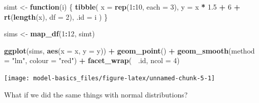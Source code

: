 \documentclass[]{book}
\newenvironment{Shaded}{\begin{snugshade}}{\end{snugshade}}
\newcommand{\ControlFlowTok}[1]{\textcolor[rgb]{0.13,0.29,0.53}{\textbf{#1}}}
\newcommand{\DataTypeTok}[1]{\textcolor[rgb]{0.13,0.29,0.53}{#1}}
\newcommand{\DecValTok}[1]{\textcolor[rgb]{0.00,0.00,0.81}{#1}}
\newcommand{\FloatTok}[1]{\textcolor[rgb]{0.00,0.00,0.81}{#1}}
\newcommand{\KeywordTok}[1]{\textcolor[rgb]{0.13,0.29,0.53}{\textbf{#1}}}
\newcommand{\NormalTok}[1]{#1}
\newcommand{\OperatorTok}[1]{\textcolor[rgb]{0.81,0.36,0.00}{\textbf{#1}}}
\newcommand{\StringTok}[1]{\textcolor[rgb]{0.31,0.60,0.02}{#1}}
\theoremstyle{plain}
\theoremstyle{remark}
\begin{document}
\begin{Shaded}
\begin{Highlighting}[]
\NormalTok{simt <-}\StringTok{ }\ControlFlowTok{function}\NormalTok{(i) \{}
  \KeywordTok{tibble}\NormalTok{(}
    \DataTypeTok{x =} \KeywordTok{rep}\NormalTok{(}\DecValTok{1}\OperatorTok{:}\DecValTok{10}\NormalTok{, }\DataTypeTok{each =} \DecValTok{3}\NormalTok{),}
    \DataTypeTok{y =}\NormalTok{ x }\OperatorTok{*}\StringTok{ }\FloatTok{1.5} \OperatorTok{+}\StringTok{ }\DecValTok{6} \OperatorTok{+}\StringTok{ }\KeywordTok{rt}\NormalTok{(}\KeywordTok{length}\NormalTok{(x), }\DataTypeTok{df =} \DecValTok{2}\NormalTok{),}
    \DataTypeTok{.id =}\NormalTok{ i}
\NormalTok{  )}
\NormalTok{\}}

\NormalTok{sims <-}\StringTok{ }\KeywordTok{map_df}\NormalTok{(}\DecValTok{1}\OperatorTok{:}\DecValTok{12}\NormalTok{, simt)}

\KeywordTok{ggplot}\NormalTok{(sims, }\KeywordTok{aes}\NormalTok{(}\DataTypeTok{x =}\NormalTok{ x, }\DataTypeTok{y =}\NormalTok{ y)) }\OperatorTok{+}
\StringTok{  }\KeywordTok{geom_point}\NormalTok{() }\OperatorTok{+}
\StringTok{  }\KeywordTok{geom_smooth}\NormalTok{(}\DataTypeTok{method =} \StringTok{"lm"}\NormalTok{, }\DataTypeTok{colour =} \StringTok{"red"}\NormalTok{) }\OperatorTok{+}
\StringTok{  }\KeywordTok{facet_wrap}\NormalTok{(}\OperatorTok{~}\StringTok{ }\NormalTok{.id, }\DataTypeTok{ncol =} \DecValTok{4}\NormalTok{)}
\end{Highlighting}
\end{Shaded}

\begin{center}\texttt{[image: model-basics\_files/figure-latex/unnamed-chunk-5-1]} \end{center}

What if we did the same things with normal distributions?
\end{document}
